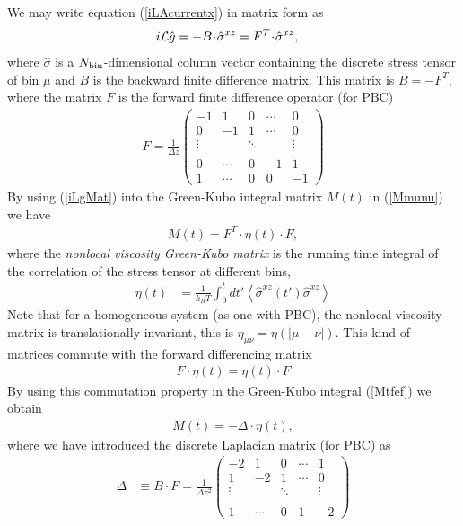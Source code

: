 \documentclass[b5paper,openright,10pt]{book}
\newcommand{\esc}{\!\cdot\!}
\newcommand{\llangle}{\left\langle}
\newcommand{\rrangle}{\right\rangle}
\begin{document}
We may write equation (\ref{iLAcurrentx}) in matrix form as
\begin{align}
  i{\cal L}\hat{g}&= -B\esc\hat{\sigma}^{xz} =F^T\esc\hat{\sigma}^{xz},
\label{iLgMat}
\end{align}
where  $\hat{\sigma}$ is  a  $N_{\rm  bin}$-dimensional column  vector
containing the  discrete stress tensor  of bin  $\mu$ and $B$  is the
backward finite difference matrix.  This matrix is $B=-F^T$, where the
matrix $ F$ is the forward finite difference operator (for PBC)
\begin{align}
 {F}=\frac{1}{\Delta z}\left(
    \begin{array}{rrrrr}
-1&1&0&\cdots&0\\
0&-1&1&\cdots&0\\
\vdots      &&\ddots&&\vdots\\
\\
0&\cdots&0&-1&1 
\\
1&\cdots&0&0&-1 \end{array}
\right)
\label{Dforward}
\end{align}
By using (\ref{iLgMat}) into the Green-Kubo integral matrix $M(t)$ in (\ref{Mmunu})
we have
\begin{align}
  M(t)=F^T\esc\eta(t)\esc F,
\label{Mtfef}
\end{align}
where  the  \textit{nonlocal  viscosity  Green-Kubo  matrix}  is  the
running  time integral  of the  correlation  of the  stress tensor  at
different bins,
\begin{align}
  \eta(t) &=\frac{1}{k_BT}\int_0^{t}dt' 
  \llangle \hat{\sigma}^{xz}(t')\hat{\sigma}^{xz}\rrangle
\label{non-loc}
\end{align}
Note that  for a homogeneous system  (as one with PBC),  the nonlocal
viscosity    matrix   is    translationally    invariant,   this    is
$\eta_{\mu\nu}=\eta(|\mu-\nu|)$.  This kind  of matrices  commute with
the forward differencing matrix
\begin{align}
  F\esc\eta(t)=\eta(t)\esc F
\label{commute}
\end{align}
By using this commutation property 
 in the Green-Kubo
integral (\ref{Mtfef}) we obtain
\begin{align}
  M(t)=-\Delta\esc \eta(t),
\label{MmunuMat}
\end{align}
where we have introduced  the discrete Laplacian matrix (for PBC) as
\begin{align}
\Delta&\equiv  B\esc F
=\frac{1}{\Delta z^2}\left(
    \begin{array}{rrrrr}
-2&1&0&\cdots&1\\
1&-2&1&\cdots&0\\
\vdots      &&\ddots&&\vdots\\
\\
1&\cdots&0&1&-2    \end{array}
\right)
\end{align}
\end{document}
